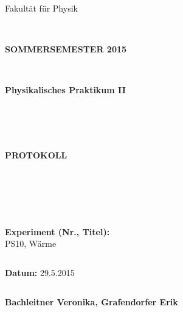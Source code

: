\documentclass[12pt,a4paper,twopage]{article}
\begin{document}
\thispagestyle{empty}
			\begin{center}
			\Large{Fakultät für Physik}\\
			\end{center}
\begin{verbatim}


\end{verbatim}
			\begin{center}
			\textbf{\LARGE SOMMERSEMESTER 2015}
			\end{center}
\begin{verbatim}


\end{verbatim}
			\begin{center}
			\textbf{\LARGE{Physikalisches Praktikum II}}
			\end{center}
\begin{verbatim}




\end{verbatim}

			\begin{center}
			\textbf{\LARGE{PROTOKOLL}}
			\end{center}
			
\begin{verbatim}





\end{verbatim}

			\begin{flushleft}
			\textbf{\Large{Experiment (Nr., Titel):}}\\
			PS10, Wärme
			\LARGE{}	
			\end{flushleft}

\begin{verbatim}

\end{verbatim}	
			\begin{flushleft}
			\textbf{\Large{Datum:}} \Large{29.5.2015}
			\end{flushleft}
			
\begin{verbatim}
\end{verbatim}
		\begin{flushleft}
			\textbf{\Large{Bachleitner Veronika, Grafendorfer Erik}} 
			\end{flushleft}
\end{document}
